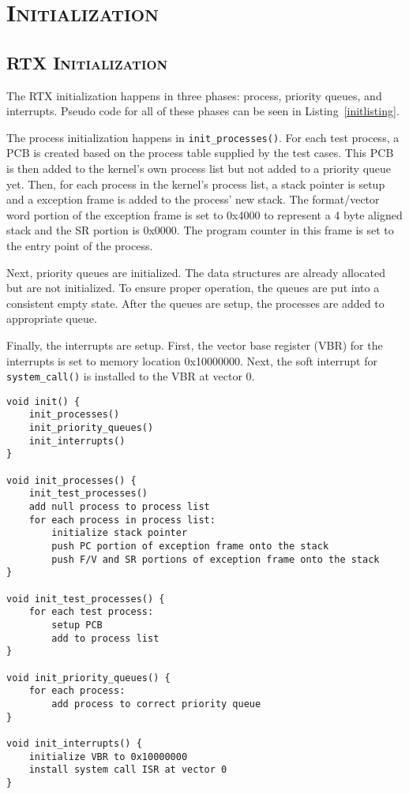 \documentclass[oneside]{report}
\begin{document}
\section{\textsc{Initialization}}

\subsection{\textsc{RTX Initialization}}
\label{sec:rtx_init}
The RTX initialization happens in three phases: process, priority queues, 
and interrupts. Pseudo code for all of these phases can be seen in
Listing~\ref{initlisting}.

The process initialization happens in \texttt{init\_processes()}. For each test
process, a PCB is created based on the process table supplied by the test
cases. This PCB is then added to the kernel's own process list but not added to
a priority queue yet. Then, for each process in the kernel's process list, a
stack pointer is setup and a exception frame is added to the process' new
stack. The format/vector word portion of the exception frame is set to 0x4000
to represent a 4 byte aligned stack and the SR portion is 0x0000. The program
counter in this frame is set to the entry point of the process.

Next, priority queues are initialized. The data structures are already
allocated but are not initialized. To ensure proper operation, the queues are
put into a consistent empty state. After the queues are setup, the processes
are added to appropriate queue.

Finally, the interrupts are setup. First, the vector base register (VBR) for the
interrupts is set to memory location 0x10000000. Next, the soft interrupt for
\texttt{system\_call()} is installed to the VBR at vector 0.

\begin{lstlisting}
void init() {
    init_processes()
    init_priority_queues()
    init_interrupts()
}

void init_processes() {
    init_test_processes()
    add null process to process list
    for each process in process list:
        initialize stack pointer
        push PC portion of exception frame onto the stack
        push F/V and SR portions of exception frame onto the stack
}

void init_test_processes() {
    for each test process: 
        setup PCB
        add to process list
}

void init_priority_queues() {
    for each process: 
        add process to correct priority queue
}

void init_interrupts() {
    initialize VBR to 0x10000000
    install system call ISR at vector 0
}
\end{lstlisting}
\end{document}
